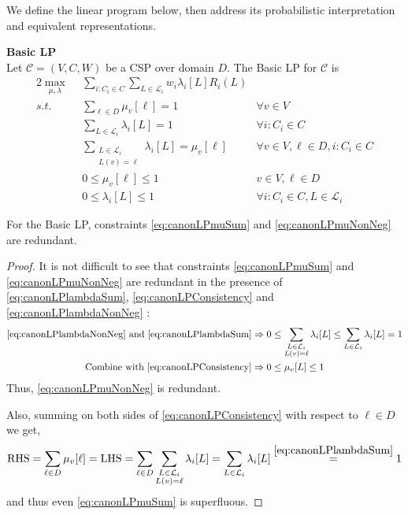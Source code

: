 We define the linear program below, then address its probabilistic interpretation and equivalent representations.
\begin{definition}\textbf{Basic LP} \\
Let $\mathcal{C} = (V,C,W)$ be a CSP over domain $D$. The Basic LP for $\mathcal{C}$ is
\begin{alignat}{2}
\max_{\mu, \lambda} ~&~ \sum_{i : C_i \in C} \sum_{L \in \mathcal{L}_i}   w_i\lambda_i[L] R_i(L) & \\
s.t. ~ & ~ \sum_{\ell \in D} \mu_v[\ell] = 1 & \forall v \in V  \label{eq:canonLPmuSum} \\
     ~ & ~ \sum_{L \in \mathcal{L}_i} \lambda_i[L] = 1  & \forall i : C_i \in C \label{eq:canonLPlambdaSum} \\
     ~ & ~ \sum_{\substack{ L \in \mathcal{L}_i \\ L(v) = \ell }} \lambda_i[L] = \mu_v[\ell]  & \forall v \in V, \ell \in D, i : C_i \in C \label{eq:canonLPConsistency} \\
     ~ & ~ 0 \leq \mu_v[\ell] \leq 1 & v \in V, \ell \in D \label{eq:canonLPmuNonNeg}\\
     ~ & ~ 0 \leq \lambda_i[L] \leq 1  & \forall  i : C_i \in C, L \in \mathcal{L}_i  \label{eq:canonLPlambdaNonNeg} 
\end{alignat}
\end{definition}

\begin{lemma}\label{le:super}
For the Basic LP, constraints \ref{eq:canonLPmuSum} and \ref{eq:canonLPmuNonNeg} are redundant. 
\end{lemma}
\begin{proof}
It is not difficult to see that constraints \ref{eq:canonLPmuSum} and \ref{eq:canonLPmuNonNeg} are redundant in the presence of \ref{eq:canonLPlambdaSum}, \ref{eq:canonLPConsistency} and \ref{eq:canonLPlambdaNonNeg} :
\begin{align*}
\ref{eq:canonLPlambdaNonNeg} \rm{\ and \ } \ref{eq:canonLPlambdaSum} &\Rightarrow 0\leq  \sum_{\substack{ L \in \mathcal{L}_i \\ L(v) = \ell }} \lambda_i[L] \leq  \sum_{L \in \mathcal{L}_i} \lambda_i[L] = 1  \\
{\rm \ Combine\ with \ }\ref{eq:canonLPConsistency}&\Rightarrow  0\leq \mu_v[L] \leq 1
\end{align*}
Thus, \ref{eq:canonLPmuNonNeg} is redundant. 

Also, summing on both sides of \ref{eq:canonLPConsistency} with respect to $\ell \in D$ we get, 
\begin{align*}
{\rm RHS} = \sum_{\ell \in D} \mu_v[\ell] = {\rm LHS} = \sum_{\ell \in D} \sum_{\substack{ L \in \mathcal{L}_i \\ L(v) = \ell }} \lambda_i[L] = \sum_{L \in \mathcal{L}_i} \lambda_i[L] \overset{\ref{eq:canonLPlambdaSum}}=1
\end{align*}
and thus even \ref{eq:canonLPmuSum} is superfluous.
\end{proof}

